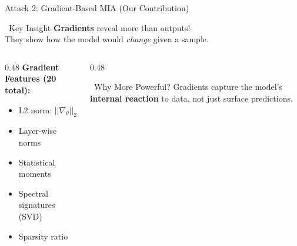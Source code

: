\documentclass[aspectratio=169, 11pt]{beamer}
\begin{document}
\begin{frame}{Attack 2: Gradient-Based MIA (Our Contribution)}
    \begin{block}{\faLightbulb\ Key Insight}
        \textbf{Gradients} reveal more than outputs!\\
        They show how the model would \textit{change} given a sample.
    \end{block}
    
    \vspace{0.5em}
    \begin{columns}[T]
        \begin{column}{0.48\textwidth}
            \textbf{Gradient Features (20 total):}
            \begin{itemize}
                \item L2 norm: $||\nabla_\theta||_2$
                \item Layer-wise norms
                \item Statistical moments
                \item Spectral signatures (SVD)
                \item Sparsity ratio
            \end{itemize}
        \end{column}
        
        \begin{column}{0.48\textwidth}
            \begin{exampleblock}{\faChartLine\ Why More Powerful?}
                Gradients capture the model's \textbf{internal reaction} to data, not just surface predictions.
            \end{exampleblock}
        \end{column}
    \end{columns}
\end{frame}
\end{document}
